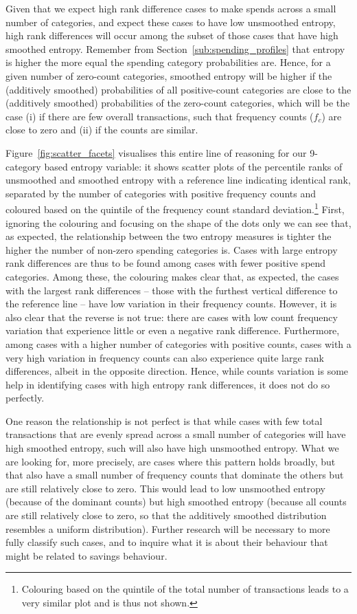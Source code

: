 Given that we expect high rank difference cases to make spends across a small
number of categories, and expect these cases to have low unsmoothed entropy,
high rank differences will occur among the subset of those cases that have high
smoothed entropy. Remember from Section~\ref{sub:spending_profiles} that
entropy is higher the more equal the spending category probabilities are.
Hence, for a given number of zero-count categories, smoothed entropy will be
higher if the (additively smoothed) probabilities of all positive-count
categories are close to the (additively smoothed) probabilities of the
zero-count categories, which will be the case (i) if there are few overall
transactions, such that frequency counts ($f_c$) are close to zero and (ii) if
the counts are similar.

Figure~\ref{fig:scatter_facets} visualises this entire line of reasoning for
our 9-category based entropy variable: it shows scatter plots of the percentile
ranks of unsmoothed and smoothed entropy with a reference line indicating
identical rank, separated by the number of categories with positive frequency
counts and coloured based on the quintile of the frequency count standard
deviation.\footnote{Colouring based on the quintile of the total number of
transactions leads to a very similar plot and is thus not shown.} First,
ignoring the colouring and focusing on the shape of the dots only we can see
that, as expected, the relationship between the two entropy measures is tighter
the higher the number of non-zero spending categories is. Cases with large
entropy rank differences are thus to be found among cases with fewer positive
spend categories. Among these, the colouring makes clear that, as expected, the
cases with the largest rank differences -- those with the furthest vertical
difference to the reference line -- have low variation in their frequency
counts. However, it is also clear that the reverse is not true: there are cases
with low count frequency variation that experience little or even a negative
rank difference. Furthermore, among cases with a higher number of categories
with positive counts, cases with a very high variation in frequency counts can
also experience quite large rank differences, albeit in the opposite direction.
Hence, while counts variation is some help in identifying cases with high
entropy rank differences, it does not do so perfectly.

One reason the relationship is not perfect is that while cases with few total
transactions that are evenly spread across a small number of categories will
have high smoothed entropy, such will also have high unsmoothed entropy. What
we are looking for, more precisely, are cases where this pattern holds broadly,
but that also have a small number of frequency counts that dominate the others
but are still relatively close to zero. This would lead to low unsmoothed
entropy (because of the dominant counts) but high smoothed entropy (because all
counts are still relatively close to zero, so that the additively smoothed
distribution resembles a uniform distribution). Further research will be
necessary to more fully classify such cases, and to inquire what it is about
their behaviour that might be related to savings behaviour.


